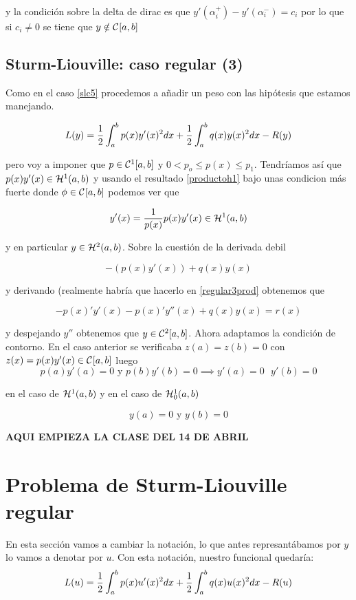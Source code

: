 y la condición sobre la delta de dirac es que
$y'(\alpha_i^+) - y'(\alpha_i^-) = c_i$ por lo que si $c_i \neq 0$ se
tiene que $y\notin\continuas$


\subsection{Sturm-Liouville: caso regular (3)}
Como en el caso \eqref{slc5} procedemos a añadir un peso con las
hipótesis que estamos manejando.

\[
L(y)=\frac{1}{2}\integral{a}{b}{p(x)y'(x)^2dx}+\frac{1}{2}\integral{a}{b}{q(x)y(x)^2dx}-R(y)
\]

pero voy a imponer que $p\in\continuas[1]$ y
$0 < p_o \leq p(x) \leq p_1$. Tendríamos así que
$p(x)y'(x)\in\sobolev{1}$ y usando el resultado \eqref{productoh1}
bajo unas condicion más fuerte donde $\phi\in\continuas$ podemos ver
que

\[
 y'(x) = \frac{1}{p(x)}p(x)y'(x) \in \sobolev{1} \label{regular3prod}
\]

y en particular $y\in\sobolev{2}$. Sobre la cuestión de la derivada
debil

\[
-(p(x)y'(x)) + q(x)y(x)
\]

y derivando (realmente habría que hacerlo en \ref{regular3prod} obtenemos que

\[
-p(x)'y'(x)  - p(x)'y''(x) + q(x)y(x) = r(x)
\]

y despejando $y''$ obtenemos que $y\in\continuas[2]$. Ahora adaptamos
la condición de contorno. En el caso anterior se verificaba
$z(a) = z(b) = 0$ con $z(x) = p(x)y'(x) \in \continuas$ luego
\[
  p(a)y'(a) = 0 \text{ y } p(b)y'(b) = 0 \implies y'(a) = 0 \text { } y'(b) = 0
\]

en el caso de $\sobolev{1}$ y en el caso de $\sobolevcero{1}$

\[
  y(a) = 0 \text{ y } y(b) = 0
\]

\textbf{AQUI EMPIEZA LA CLASE DEL 14 DE ABRIL}

\section{Problema de Sturm-Liouville regular}

En esta sección vamos a cambiar la notación, lo que antes represantábamos por $y$ lo vamos a denotar por $u$. Con esta notación, nuestro funcional quedaría:
\begin{equation}\label{ff}
L(u)=\frac{1}{2}\integral{a}{b}{p(x)u'(x)^2dx}+\frac{1}{2}\integral{a}{b}{q(x)u(x)^2dx}-R(u)
\end{equation}

